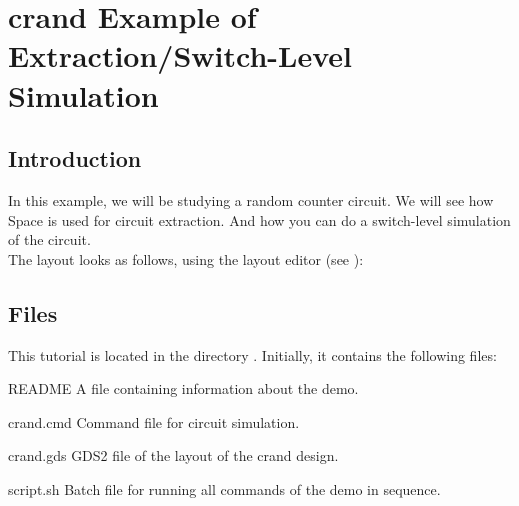 \chapter{crand Example of Extraction/Switch-Level Simulation}
\section{Introduction}
\label{PEintro}
In this example, we will be studying a random counter circuit.
We will see how Space is used for circuit extraction.
And how you can do a switch-level simulation of the circuit.
\\[1 ex]
The layout looks as follows, using the layout editor  (see ):

\begin{figure}[h]
\centerline{}
\end{figure}

\section{Files}
This tutorial is located in the directory .
Initially, it contains the following files:
\begin{filelist}
\item[README] A file containing information about the demo.
\item[crand.cmd] Command file for circuit simulation.
\item[crand.gds] GDS2 file of the layout of the crand design.
\item[script.sh] Batch file for running all commands of the demo in sequence.
\end{filelist}

